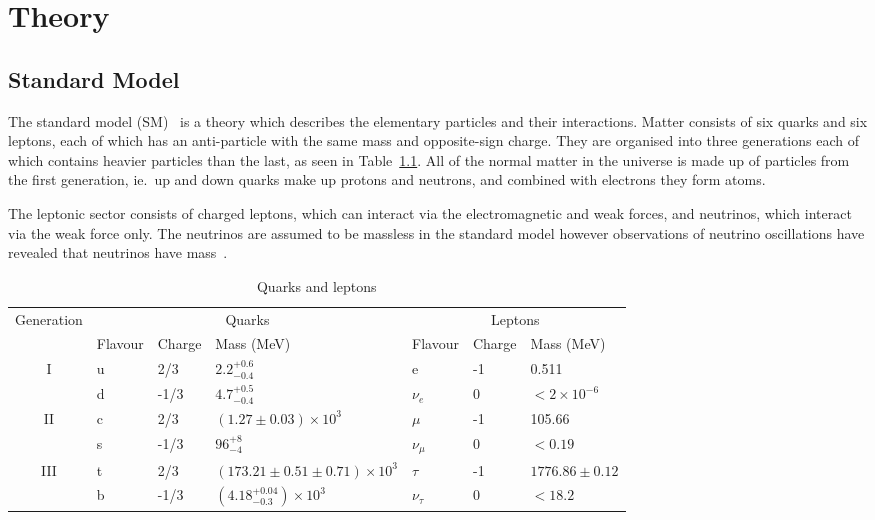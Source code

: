 \chapter{Theory}
\label{c:theory}

\section{Standard Model}

The standard model (SM)~\cite{Glashow:1961tr,PhysRevLett.19.1264,Salam:1968rm,DGriff} is a theory which describes the elementary particles and their interactions. Matter consists of six quarks and six leptons, each of which has an anti-particle with the same mass and opposite-sign charge. They are organised into three generations each of which contains heavier particles than the last, as seen in Table~\ref{table:SMmatter}. All of the normal matter in the universe is made up of particles from the first generation, ie.~up and down quarks make up protons and neutrons, and combined with electrons they form atoms. 

The leptonic sector consists of charged leptons, which can interact via the electromagnetic and weak forces, and neutrinos, which interact via the weak force only. The neutrinos are assumed to be massless in the standard model however observations of neutrino oscillations have revealed that neutrinos have mass~\cite{PhysRevC.88.025501}.

\vspace{0.8cm}
\begin{table}[ht!]
\centering
\caption{Quarks and leptons}
\label{table:SMmatter}
\footnotesize
\begin{tabular}{|c|l|l|l|l|l|l|}
\hline
\multirow{2}{*}{Generation} & \multicolumn{3}{c|}{Quarks}                             & \multicolumn{3}{c|}{Leptons}              \\ \cline{2-7} 
                            & Flavour & Charge & Mass (MeV)                           & Flavour      & Charge & Mass (MeV)        \\ \hline
\hline

\multirow{2}{*}{I}          & u       & 2/3    & $2.2^{+0.6}_{-0.4}$                  & e            & -1     & 0.511             \\
                            & d       & -1/3   & $4.7^{+0.5}_{-0.4}$                  & $\nu_{e}$    & 0      & $<2\times10^{-6}$ \\ \hline
\multirow{2}{*}{II}         & c       & 2/3    & $(1.27\pm 0.03)\times10^{3}$         & $\mu$        & -1     & 105.66            \\
                            & s       & -1/3   & $96^{+8}_{-4}$                       & $\nu_{\mu}$  & 0      & $<0.19$           \\ \hline
\multirow{2}{*}{III}        & t       & 2/3    & $(173.21\pm0.51\pm0.71)\times10^{3}$ & $\tau$       & -1     & $1776.86\pm0.12$  \\
                            & b       & -1/3   & $(4.18^{+0.04}_{-0.3})\times10^{3}$  & $\nu_{\tau}$ & 0      & $<18.2$           \\ \hline
\end{tabular}
\end{table}

